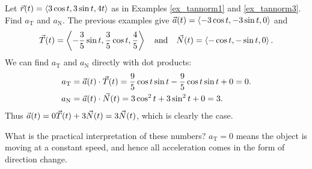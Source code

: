 \begin{example}\label{ex_tannorm5}%
Let $\vec r(t) =\left\langle 3\cos t, 3\sin t, 4t\right\rangle$ as in Examples \ref{ex_tannorm1} and \ref{ex_tannorm3}. Find $a_\mathrm{T}$ and $a_\mathrm{N}$.
\solution
The previous examples give $\vec a(t) =\left\langle -3\cos t,-3\sin t,0\right\rangle$ and 
\[\vec T(t) =\left\langle -\frac35\sin t,\frac35\cos t,\frac45\right\rangle\quad \text{and}\quad \vec N(t) =\left\langle -\cos t,-\sin t,0\right\rangle.\]
We can find $a_\mathrm{T}$ and $a_\mathrm{N}$ directly with dot products:
\begin{align*}
a_\mathrm{T} &= \vec a(t)\cdot \vec T(t) = \frac95\cos t\sin t-\frac95\cos t\sin t+0 = 0.\\
a_\mathrm{N} &= \vec a(t)\cdot \vec N(t) = 3\cos^2t+3\sin^2t + 0 = 3.
\end{align*}
Thus $\vec a(t) = 0\vec T(t) + 3\vec N(t) = 3\vec N(t)$, which is clearly the case.

What is the practical interpretation of these numbers? $a_\mathrm{T}=0$ means the object is moving at a constant speed, and hence all acceleration comes in the form of direction change.
\end{example}


